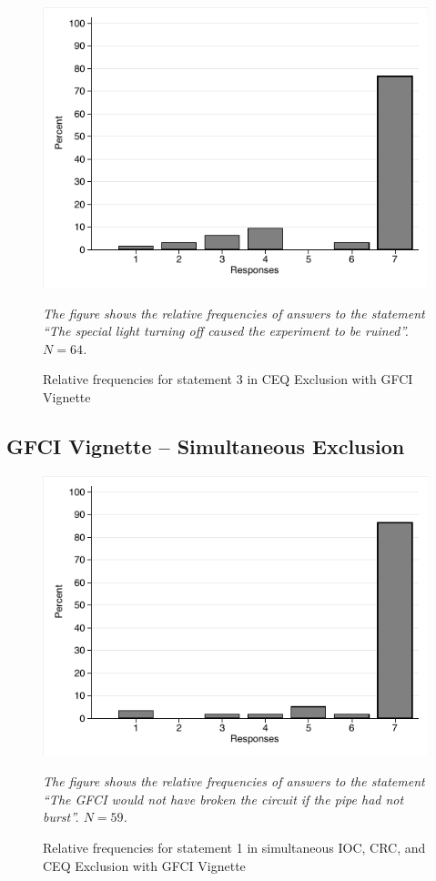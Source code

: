 \documentclass[egregdoesnotlikesansseriftitles,12pt]{scrartcl}
\begin{document}
\begin{figure}[H]
   \centering
   \includegraphics[scale=0.8]{figures/cir_ceq_hist_3.pdf}
   \begin{minipage}{0.9\linewidth}
   \footnotesize
   \emph{The figure shows the relative frequencies of answers to the statement ``The special light turning off caused the experiment to be ruined''. $N=64$.}
   \end{minipage}
   \caption{Relative frequencies for statement 3 in CEQ Exclusion with GFCI Vignette}
   \label{fig:cir_ceq_hist_3}
\end{figure}

\subsection{GFCI Vignette -- Simultaneous Exclusion}
\begin{figure}[H]
   \centering
   \includegraphics[scale=0.8]{figures/cir_com_hist_1.pdf}
   \begin{minipage}{0.9\linewidth}
   \footnotesize
   \emph{The figure shows the relative frequencies of answers to the statement ``The GFCI would not have broken the circuit if the pipe had not burst''. $N=59$.}
   \end{minipage}
   \caption{Relative frequencies for statement 1 in simultaneous IOC, CRC, and CEQ Exclusion with GFCI Vignette}
   \label{fig:cir_com_hist_1}
\end{figure}
\end{document}
